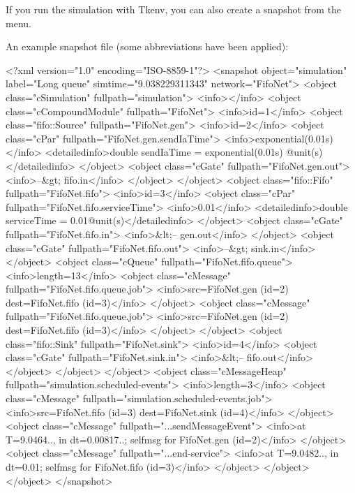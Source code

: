 If you run the simulation with Tkenv, you can also create a snapshot
from the menu.

An example snapshot file (some abbreviations have been applied):

\begin{filelisting}
<?xml version="1.0" encoding="ISO-8859-1"?>
<snapshot object="simulation" label="Long queue" simtime="9.038229311343"
network="FifoNet">
  <object class="cSimulation" fullpath="simulation">
    <info></info>
    <object class="cCompoundModule" fullpath="FifoNet">
      <info>id=1</info>
      <object class="fifo::Source" fullpath="FifoNet.gen">
        <info>id=2</info>
        <object class="cPar" fullpath="FifoNet.gen.sendIaTime">
          <info>exponential(0.01s)</info>
          <detailedinfo>double sendIaTime = exponential(0.01s) @unit(s)
          </detailedinfo>
        </object>
        <object class="cGate" fullpath="FifoNet.gen.out">
          <info>--&gt; fifo.in</info>
        </object>
      </object>
      <object class="fifo::Fifo" fullpath="FifoNet.fifo">
        <info>id=3</info>
        <object class="cPar" fullpath="FifoNet.fifo.serviceTime">
          <info>0.01</info>
          <detailedinfo>double serviceTime = 0.01@unit(s)</detailedinfo>
        </object>
        <object class="cGate" fullpath="FifoNet.fifo.in">
          <info>&lt;-- gen.out</info>
        </object>
        <object class="cGate" fullpath="FifoNet.fifo.out">
          <info>--&gt; sink.in</info>
        </object>
        <object class="cQueue" fullpath="FifoNet.fifo.queue">
          <info>length=13</info>
          <object class="cMessage" fullpath="FifoNet.fifo.queue.job">
            <info>src=FifoNet.gen (id=2)  dest=FifoNet.fifo (id=3)</info>
          </object>
          <object class="cMessage" fullpath="FifoNet.fifo.queue.job">
            <info>src=FifoNet.gen (id=2)  dest=FifoNet.fifo (id=3)</info>
          </object>
        </object>
      <object class="fifo::Sink" fullpath="FifoNet.sink">
        <info>id=4</info>
        <object class="cGate" fullpath="FifoNet.sink.in">
          <info>&lt;-- fifo.out</info>
        </object>
      </object>
    </object>
    <object class="cMessageHeap" fullpath="simulation.scheduled-events">
      <info>length=3</info>
      <object class="cMessage" fullpath="simulation.scheduled-events.job">
        <info>src=FifoNet.fifo (id=3)  dest=FifoNet.sink (id=4)</info>
      </object>
      <object class="cMessage" fullpath="...sendMessageEvent">
        <info>at T=9.0464.., in dt=0.00817..; selfmsg for FifoNet.gen (id=2)</info>
      </object>
      <object class="cMessage" fullpath="...end-service">
        <info>at T=9.0482.., in dt=0.01; selfmsg for FifoNet.fifo (id=3)</info>
      </object>
    </object>
  </object>
</snapshot>

\end{filelisting}



